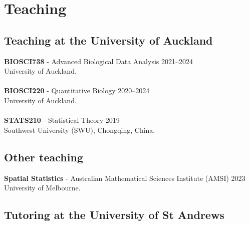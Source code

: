 \documentclass[10pt,letter]{article}
\begin{document}
 \section*{Teaching}
\vspace{1mm}
 \subsection*{Teaching at the University of Auckland}
 \vspace{1mm}
 \textbf{BIOSCI738} - Advanced Biological Data Analysis \hfill{2021--2024} \\
 University of Auckland.\\
\hdashrule[0.5ex]{4cm}{1pt}{1pt}\\
 \textbf{BIOSCI220} - Quantitative Biology \hfill{2020--2024} \\
 University of Auckland.\\
\hdashrule[0.5ex]{4cm}{1pt}{1pt}\\
 \textbf{STATS210} - Statistical Theory \hfill{2019} \\
 Southwest University (SWU), Chongqing, China.

\vspace{1mm}
 \subsection*{Other teaching}
 \vspace{1mm}

 \textbf{Spatial Statistics} - Australian Mathematical Sciences Institute (AMSI) \hfill{2023} \\
 University of Melbourne.\\
 
\vspace{1mm}
 \subsection*{Tutoring at the University of St Andrews}
 \vspace{1mm}
 
\end{document}
